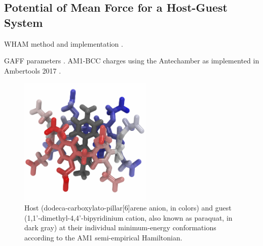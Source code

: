 \documentclass[
    journal=jctcce,
    layout=twocolumn
]{achemso}
\newcommand{\avg}[1]{\overline{#1}}             %
\begin{document}
%


\subsection{Potential of Mean Force for a Host-Guest System}

WHAM method\cite{Ferrenberg_1989, *Kumar_1992} and implementation \cite{Grossfield_nodate}.

GAFF parameters \cite{Wang_2004}. AM1-BCC charges \cite{Jakalian_2000, *Jakalian_2002} using the Antechamber \cite{Wang_2006} as implemented in Ambertools 2017 \cite{Case_2017}.


\begin{figure}
	\label{fig:carboxylatopillar[6]arene}
	\centering
	\includegraphics[width=2.5in]{wp6_paraquat.png}
	\caption{Host (dodeca-carboxylato-pillar[6]arene anion, in colors) and guest (1,1'-dimethyl-4,4'-bipyridinium cation, also known as paraquat, in dark gray) at their individual minimum-energy conformations according to the AM1 semi-empirical Hamiltonian.}
\end{figure}
\end{document}
